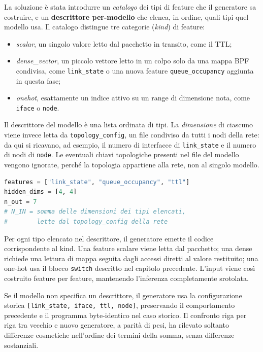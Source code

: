 \documentclass[binding=0.6cm,italian,oneside,noexaminfo]{sapthesis}
\begin{document}
La soluzione è stata introdurre un \emph{catalogo} dei tipi di feature che il generatore sa costruire, e un \textbf{descrittore per-modello} che elenca, in ordine, quali tipi quel modello usa. Il catalogo distingue tre categorie (\emph{kind}) di feature:
\begin{itemize}
    \item \emph{scalar}, un singolo valore letto dal pacchetto in transito, come il TTL;
    \item \emph{dense\_vector}, un piccolo vettore letto in un colpo solo da una mappa BPF condivisa, come \texttt{link\_state} o una nuova feature \texttt{queue\_occupancy} aggiunta in questa fase;
    \item \emph{onehot}, esattamente un indice attivo su un range di dimensione nota, come \texttt{iface} o \texttt{node}.
\end{itemize}

Il descrittore del modello è una lista ordinata di tipi. La \emph{dimensione} di ciascuno viene invece letta da \texttt{topology\_config}, un file condiviso da tutti i nodi della rete: da qui si ricavano, ad esempio, il numero di interfacce di \texttt{link\_state} e il numero di nodi di \texttt{node}. Le eventuali chiavi topologiche presenti nel file del modello vengono ignorate, perché la topologia appartiene alla rete, non al singolo modello.

\begin{lstlisting}[language=Python,caption={Descrittore per-modello: solo i TIPI, non le dimensioni}]
features = ["link_state", "queue_occupancy", "ttl"]
hidden_dims = [4, 4]
n_out = 7
# N_IN = somma delle dimensioni dei tipi elencati,
#        lette dal topology_config della rete
\end{lstlisting}

Per ogni tipo elencato nel descrittore, il generatore emette il codice corrispondente al kind. Una feature scalare viene letta dal pacchetto; una dense richiede una lettura di mappa seguita dagli accessi diretti al valore restituito; una one-hot usa il blocco \texttt{switch} descritto nel capitolo precedente. L'input viene così costruito feature per feature, mantenendo l'inferenza completamente srotolata.

Se il modello non specifica un descrittore, il generatore usa la configurazione storica \texttt{[link\_state, iface, ttl, node]}, preservando il comportamento precedente e il programma byte-identico nel caso storico. Il confronto riga per riga tra vecchio e nuovo generatore, a parità di pesi, ha rilevato soltanto differenze cosmetiche nell'ordine dei termini della somma, senza differenze sostanziali.
\end{document}
